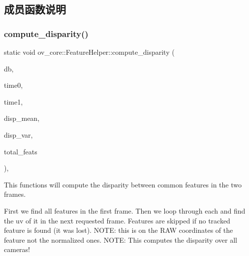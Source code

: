 \subsection{成员函数说明}
\mbox{\label{classov__core_1_1FeatureHelper_a1371c7d11c6d74693f7cec9deea2afcd}} 
\subsubsection{\texorpdfstring{compute\+\_\+disparity()}{compute\_disparity()}\hspace{0.1cm}{\footnotesize\ttfamily [1/2]}}
{\footnotesize\ttfamily static void ov\+\_\+core\+::\+Feature\+Helper\+::compute\+\_\+disparity (\begin{DoxyParamCaption}\item[{std\+::shared\+\_\+ptr$<$ \hyperlink{classov__core_1_1FeatureDatabase}{ov\+\_\+core\+::\+Feature\+Database} $>$}]{db,  }\item[{double}]{time0,  }\item[{double}]{time1,  }\item[{double \&}]{disp\+\_\+mean,  }\item[{double \&}]{disp\+\_\+var,  }\item[{int \&}]{total\+\_\+feats }\end{DoxyParamCaption})\hspace{0.3cm}{\ttfamily [inline]}, {\ttfamily [static]}}



This functions will compute the disparity between common features in the two frames. 

First we find all features in the first frame. Then we loop through each and find the uv of it in the next requested frame. Features are skipped if no tracked feature is found (it was lost). N\+O\+TE\+: this is on the R\+AW coordinates of the feature not the normalized ones. N\+O\+TE\+: This computes the disparity over all cameras!


